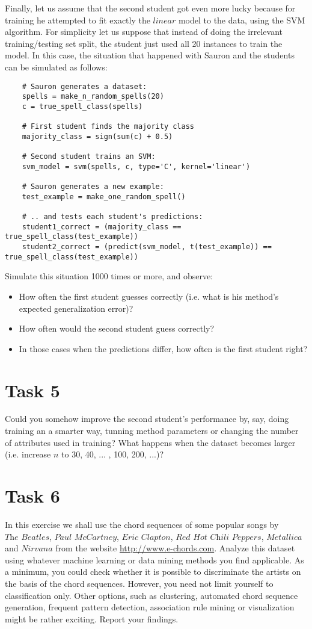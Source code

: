 \documentclass{article}
\begin{document}
Finally, let us assume that the second student got even more lucky because for training he attempted to fit exactly the $\textit{linear}$ model to the data, using the SVM algorithm. For simplicity let us suppose that instead of doing the irrelevant training/testing set split, the student just used all 20 instances to
train the model.
In this case, the situation that happened with Sauron and the students can be simulated as follows:
\begin{lstlisting}
    # Sauron generates a dataset:
    spells = make_n_random_spells(20)
    c = true_spell_class(spells)
    
    # First student finds the majority class
    majority_class = sign(sum(c) + 0.5)
    
    # Second student trains an SVM:
    svm_model = svm(spells, c, type='C', kernel='linear')

    # Sauron generates a new example:
    test_example = make_one_random_spell()
    
    # .. and tests each student's predictions:
    student1_correct = (majority_class == true_spell_class(test_example))
    student2_correct = (predict(svm_model, t(test_example)) == true_spell_class(test_example))
\end{lstlisting}
Simulate this situation 1000 times or more, and observe:
\begin{itemize}
\item How often the first student guesses correctly (i.e. what is his method's expected generalization error)?
\item How often would the second student guess correctly?
\item In those cases when the predictions differ, how often is the first student right?
\end{itemize}
\section*{Task 5}
Could you somehow improve the second student's performance by, say, doing training an a smarter way, tunning method parameters or changing the number of attributes used in training? What happens when the dataset becomes larger (i.e. increase  $\textit{n}$ to 30, 40, ... , 100, 200, ...)?

\section*{Task 6}
In this exercise we shall use the chord sequences of some popular songs by $\textit{The Beatles}$, $\textit{Paul McCartney}$, $\textit{Eric Clapton}$, $\textit{Red Hot Chili Peppers}$, $\textit{Metallica}$ and $\textit{Nirvana}$ from the website \url{http://www.e-chords.com}. Analyze this dataset using whatever machine learning or data mining methods you find applicable. As a minimum, you could check whether it is possible to discriminate the artists on the basis of the chord sequences. However, you need not limit yourself to classification only. Other options, such as clustering, automated chord sequence generation, frequent pattern detection, association rule mining or visualization might be rather exciting. Report your findings.
\end{document}
